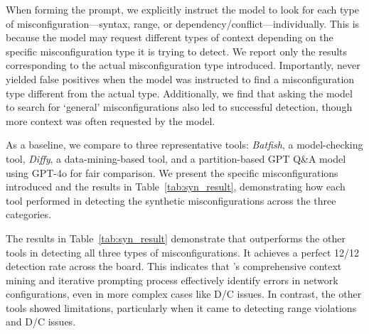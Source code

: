 When forming the prompt, we explicitly instruct the model to look for each type of misconfiguration—syntax, range, or dependency/conflict—individually. This is because the model may request different types of context depending on the specific misconfiguration type it is trying to detect. We report only the results corresponding to the actual misconfiguration type introduced. Importantly, \sysname{} never yielded false positives when the model was instructed to find a misconfiguration type different from the actual type. Additionally, we find that asking the model to search for `general' misconfigurations also led to successful detection, though more context was often requested by the model.

As a baseline, we compare \sysname{} to three representative tools: \textit{Batfish}, a model-checking tool, \textit{Diffy}, a data-mining-based tool, and a partition-based GPT Q\&A model using GPT-4o for fair comparison. We present the specific misconfigurations introduced and the results in Table~\ref{tab:syn_result}, demonstrating how each tool performed in detecting the synthetic misconfigurations across the three categories.

\begin{table}[ht]
\centering
\caption{Synthetic Misconfiguration Detection Results:}
\end{table}

The results in Table~\ref{tab:syn_result} demonstrate that \sysname{} outperforms the other tools in detecting all three types of misconfigurations. It achieves a perfect 12/12 detection rate across the board. This indicates that \sysname{}'s comprehensive context mining and iterative prompting process effectively identify errors in network configurations, even in more complex cases like D/C issues. In contrast, the other tools showed limitations, particularly when it came to detecting range violations and D/C issues.

